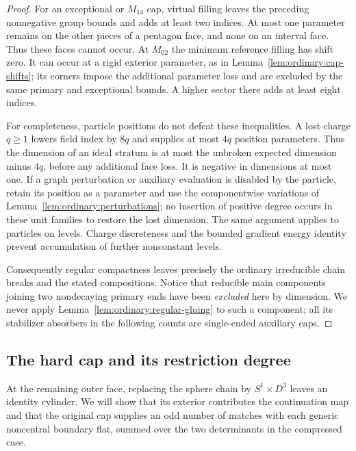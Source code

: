\begin{proof}
For an exceptional or $M_{14}$ cap, virtual filling leaves
the preceding nonnegative group bounds and adds at least
two indices.  At most one parameter remains on the other
pieces of a pentagon face, and none on an interval face.
Thus these faces cannot occur.  At $M_{02}$ the minimum
reference filling has shift zero.  It can occur at a
rigid exterior parameter, as in
Lemma~\ref{lem:ordinary:cap-shifts}; its corners impose
the additional parameter loss and are excluded by the
same primary and exceptional bounds.  A higher sector
there adds at least eight indices.

For completeness, particle positions do not defeat these
inequalities.  A lost charge $q\ge1$ lowers field index
by $8q$ and supplies at most $4q$ position parameters.
Thus the dimension of an ideal stratum is at most the
unbroken expected dimension minus $4q$, before any
additional face loss.  It is negative in dimensions at
most one.  If a graph perturbation or auxiliary evaluation
is disabled by the particle, retain its position as a
parameter and use the componentwise variations of
Lemma~\ref{lem:ordinary:perturbations}; no insertion of
positive degree occurs in these unit families to restore
the lost dimension.  The same argument applies to
particles on levels.  Charge discreteness and the bounded
gradient energy identity prevent accumulation of further
nonconstant levels.

Consequently regular compactness leaves precisely the
ordinary irreducible chain breaks and the stated
compositions.  Notice that reducible main components
joining two nondecaying primary ends have been
\emph{excluded} here by dimension.  We never apply
Lemma~\ref{lem:ordinary:regular-gluing} to such a component;
all its stabilizer absorbers in the following counts are
single-ended auxiliary caps.
\end{proof}

\subsection{The hard cap and its restriction degree}

At the remaining outer face, replacing the sphere chain by
$S^1\times D^3$ leaves an identity cylinder.  We will show that its
exterior contributes the continuation map and that the original cap
supplies an odd number of matches with each generic noncentral
boundary flat, summed over the two determinants in the compressed case.

